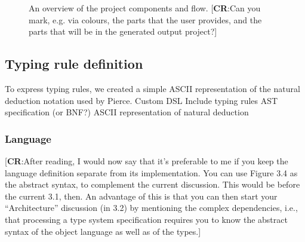 \documentclass[nofilelist]{cslthse-msc}
\newcommand{\CR}[1]{\textcolor{green!60!black}{[\textbf{CR}:#1]}}
\begin{document}
\begin{figure}[]
{
  }
  \caption{An overview of the project components and flow. \CR{Can you mark, e.g. via colours, the parts that the user provides,
           and the parts that will be in the generated output project?}}
  \label{overviewgraph}
\end{figure}

\subsection{Typing rule definition}\label{typingruledefinition}
To express typing rules, we created a simple ASCII representation of the natural deduction notation used by Pierce\cite{Pierce}.
Custom DSL
Include typing rules AST specification (or BNF?)
ASCII representation of natural deduction %
\subsubsection{Language}\label{sectionlanguage}
\CR{After reading, I would now say that it's preferable to me if you keep the language definition separate
  from its implementation.  You can use Figure 3.4 as the abstract syntax, to complement the current discussion.
  This would be before the current 3.1, then.
  An advantage of this is that you can then start your ``Architecture'' discussion (in 3.2) by mentioning
  the complex dependencies, i.e., that processing a type system specification requires you to know the abstract syntax
  of the object language as well as of the types.}
\end{document}

